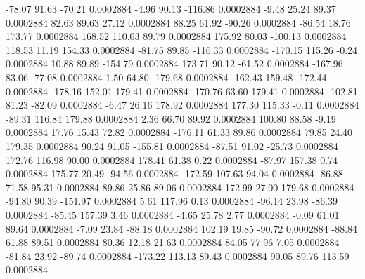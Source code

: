       -78.07       91.63      -70.21     0.0002884
       -4.96       90.13     -116.86     0.0002884
       -9.48       25.24       89.37     0.0002884
       82.63       89.63       27.12     0.0002884
       88.25       61.92      -90.26     0.0002884
      -86.54       18.76      173.77     0.0002884
      168.52      110.03       89.79     0.0002884
      175.92       80.03     -100.13     0.0002884
      118.53       11.19      154.33     0.0002884
      -81.75       89.85     -116.33     0.0002884
     -170.15      115.26       -0.24     0.0002884
       10.88       89.89     -154.79     0.0002884
      173.71       90.12      -61.52     0.0002884
     -167.96       83.06      -77.08     0.0002884
        1.50       64.80     -179.68     0.0002884
     -162.43      159.48     -172.44     0.0002884
     -178.16      152.01      179.41     0.0002884
     -170.76       63.60      179.41     0.0002884
     -102.81       81.23      -82.09     0.0002884
       -6.47       26.16      178.92     0.0002884
      177.30      115.33       -0.11     0.0002884
      -89.31      116.84      179.88     0.0002884
        2.36       66.70       89.92     0.0002884
      100.80       88.58       -9.19     0.0002884
       17.76       15.43       72.82     0.0002884
     -176.11       61.33       89.86     0.0002884
       79.85       24.40      179.35     0.0002884
       90.24       91.05     -155.81     0.0002884
      -87.51       91.02      -25.73     0.0002884
      172.76      116.98       90.00     0.0002884
      178.41       61.38        0.22     0.0002884
      -87.97      157.38        0.74     0.0002884
      175.77       20.49      -94.56     0.0002884
     -172.59      107.63       94.04     0.0002884
      -86.88       71.58       95.31     0.0002884
       89.86       25.86       89.06     0.0002884
      172.99       27.00      179.68     0.0002884
      -94.80       90.39     -151.97     0.0002884
        5.61      117.96        0.13     0.0002884
      -96.14       23.98      -86.39     0.0002884
      -85.45      157.39        3.46     0.0002884
       -4.65       25.78        2.77     0.0002884
       -0.09       61.01       89.64     0.0002884
       -7.09       23.84      -88.18     0.0002884
      102.19       19.85      -90.72     0.0002884
      -88.84       61.88       89.51     0.0002884
       80.36       12.18       21.63     0.0002884
       84.05       77.96        7.05     0.0002884
      -81.84       23.92      -89.74     0.0002884
     -173.22      113.13       89.43     0.0002884
       90.05       89.76      113.59     0.0002884
